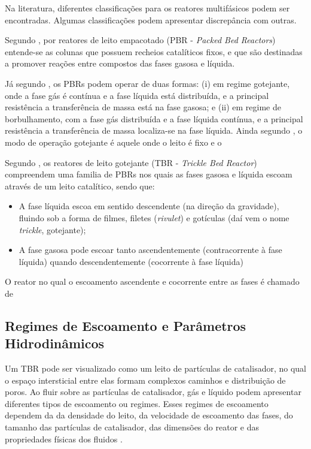 Na literatura, diferentes classificações para os reatores multifásicos podem ser encontradas. Algumas classificações podem apresentar discrepância com outras. 

Segundo , por reatores de leito empacotado (PBR - \emph{Packed Bed Reactors}) entende-se as colunas que possuem recheios catalíticos fixos, e que são destinadas a promover reações entre compostos das fases gasosa e líquida. 

Já segundo , os PBRs podem operar de duas formas: (i) em regime gotejante, onde a fase gás é contínua e a fase líquida está distribuída, e a principal resistência a transferência de massa está na fase gasosa; e (ii) em regime de borbulhamento, com a fase gás distribuída e a fase líquida contínua, e a principal resistência a transferência de massa localiza-se na fase líquida. Ainda segundo , o modo de operação gotejante é aquele onde o leito é fixo e o 

Segundo , os reatores de leito gotejante (TBR -
\emph{Trickle Bed Reactor}) compreendem uma familia de PBRs nos quais as fases
gasosa e líquida escoam através de um leito catalítico, sendo que:

\begin{itemize}
\item A fase líquida escoa em sentido descendente (na direção da gravidade),
fluindo sob a forma de filmes, filetes (\emph{rivulet}) e gotículas (daí vem o
nome \emph{trickle}, gotejante);
\item A fase gasosa pode escoar tanto ascendentemente (contracorrente à
fase líquida) quando descendentemente (cocorrente à fase líquida)
\end{itemize}

O reator no qual o escoamento ascendente e cocorrente entre as fases é chamado de  

\subsection {Regimes de Escoamento e Parâmetros Hidrodinâmicos} \label{sec:escoamento}

Um TBR pode ser visualizado como um leito de partículas de catalisador, no qual o espaço intersticial entre elas formam complexos caminhos e distribuição de poros. Ao fluir sobre as partículas de catalisador, gás e líquido podem apresentar diferentes tipos de escoamento ou regimes. Esses regimes de escoamento dependem da da densidade do leito, da velocidade de escoamento das fases, do tamanho das partículas de catalisador, das dimensões do reator e das propriedades físicas dos fluidos \cite{Ranade2011}. 

